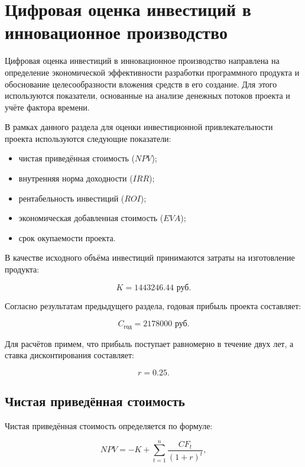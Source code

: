 \section{Цифровая оценка инвестиций в инновационное производство}

Цифровая оценка инвестиций в инновационное производство направлена на
определение экономической эффективности разработки программного
продукта и обоснование целесообразности вложения средств в его
создание. Для этого используются показатели, основанные на анализе
денежных потоков проекта и учёте фактора времени.

В рамках данного раздела для оценки инвестиционной привлекательности
проекта используются следующие показатели:
\begin{itemize}
\item чистая приведённая стоимость ($NPV$);
\item внутренняя норма доходности ($IRR$);
\item рентабельность инвестиций ($ROI$);
\item экономическая добавленная стоимость ($EVA$);
\item срок окупаемости проекта.
\end{itemize}

В качестве исходного объёма инвестиций принимаются затраты на
изготовление продукта:

\begin{equation}
K = 1443246.44 \text{ руб.}
\end{equation}

Согласно результатам предыдущего раздела, годовая прибыль проекта
составляет:

\begin{equation}
C_{\text{год}} = 2178000 \text{ руб.}
\end{equation}

Для расчётов примем, что прибыль поступает равномерно в течение двух
лет, а ставка дисконтирования составляет:

\begin{equation}
r = 0.25.
\end{equation}

\subsection*{Чистая приведённая стоимость}

Чистая приведённая стоимость определяется по формуле:

\begin{equation}
NPV = -K + \sum_{t=1}^{n} \frac{CF_t}{(1+r)^t},
\end{equation}

